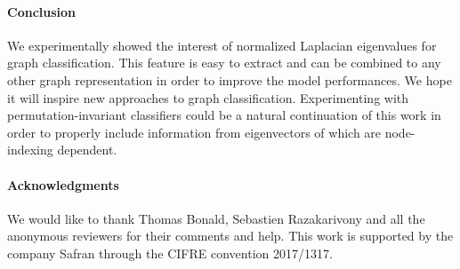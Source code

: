 \documentclass{article}
\begin{document}
\paragraph{Conclusion} We experimentally showed the interest of normalized Laplacian eigenvalues for graph classification. This feature is easy to extract and can be combined to any other graph representation in order to improve the model performances. We hope it will inspire new approaches to graph classification. Experimenting with permutation-invariant classifiers \citep{lucas2018mixed, qi2017pointnet} could be a natural continuation of this work in order to properly include information from eigenvectors of  which are node-indexing dependent.


\paragraph{Acknowledgments}
We would like to thank Thomas Bonald, Sebastien Razakarivony and all the anonymous reviewers for their comments and help. This work is supported by the company Safran through the CIFRE convention 2017/1317.
\end{document}
